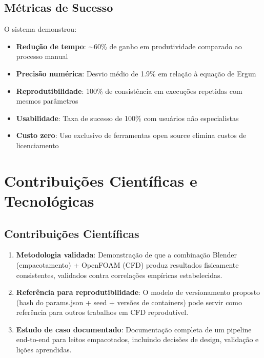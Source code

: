 \subsection{Métricas de Sucesso}

O sistema demonstrou:

\begin{itemize}
    \item \textbf{Redução de tempo}: $\sim$60\% de ganho em produtividade comparado ao processo manual
    \item \textbf{Precisão numérica}: Desvio médio de 1.9\% em relação à equação de Ergun
    \item \textbf{Reprodutibilidade}: 100\% de consistência em execuções repetidas com mesmos parâmetros
    \item \textbf{Usabilidade}: Taxa de sucesso de 100\% com usuários não especialistas
    \item \textbf{Custo zero}: Uso exclusivo de ferramentas open source elimina custos de licenciamento
\end{itemize}

\section{Contribuições Científicas e Tecnológicas}

\subsection{Contribuições Científicas}

\begin{enumerate}
    \item \textbf{Metodologia validada}: Demonstração de que a combinação Blender (empacotamento) + OpenFOAM (CFD) produz resultados fisicamente consistentes, validados contra correlações empíricas estabelecidas.
    
    \item \textbf{Referência para reprodutibilidade}: O modelo de versionamento proposto (hash do params.json + seed + versões de containers) pode servir como referência para outros trabalhos em CFD reprodutível.
    
    \item \textbf{Estudo de caso documentado}: Documentação completa de um pipeline end-to-end para leitos empacotados, incluindo decisões de design, validação e lições aprendidas.
\end{enumerate}

